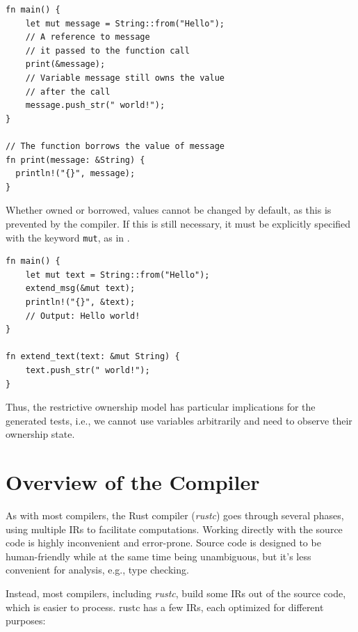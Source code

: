 \documentclass[paper=a4,%
  twoside,%
  BCOR4mm,%
  abstract=true,%
  toc=bibliography,%
  chapterprefix=true,%
  toc=bibliographynumbered,%
  open=right,%
  english,%
  pagesize=pdftex]{scrreprt}
\begin{document}
\begin{lstlisting}[style=boxed, caption={Transferring the ownership to a method}, label=lst:borrowing-method-call]
fn main() {
    let mut message = String::from("Hello");
    // A reference to message
    // it passed to the function call
    print(&message);
    // Variable message still owns the value
    // after the call
    message.push_str(" world!");
}

// The function borrows the value of message
fn print(message: &String) {
  println!("{}", message);
}
\end{lstlisting}

Whether owned or borrowed, values cannot be changed by default, as this is prevented by the compiler. If this is still necessary, it must be explicitly specified with the keyword \texttt{mut}, as in .

\begin{lstlisting}[style=boxed, caption=Transferring the ownership to a method, label=lst:mut-borrowing-method-call]
fn main() {
    let mut text = String::from("Hello");
    extend_msg(&mut text);
    println!("{}", &text);
    // Output: Hello world!
}

fn extend_text(text: &mut String) {
    text.push_str(" world!");
}
\end{lstlisting}

Thus, the restrictive ownership model has particular implications for the generated tests, i.e., we cannot use variables arbitrarily and need to observe their ownership state.

\section{Overview of the Compiler}
As with most compilers, the Rust compiler (\emph{rustc}) goes through several phases, using multiple \acp{IR} to facilitate computations. Working directly with the source code is highly inconvenient and error-prone. Source code is designed to be human-friendly while at the same time being unambiguous, but it's less convenient for analysis, e.g., type checking.

Instead, most compilers, including \emph{rustc}, build some \acp{IR} out of the source code, which is easier to process. rustc has a few \acp{IR}, each optimized for different purposes:
\end{document}
